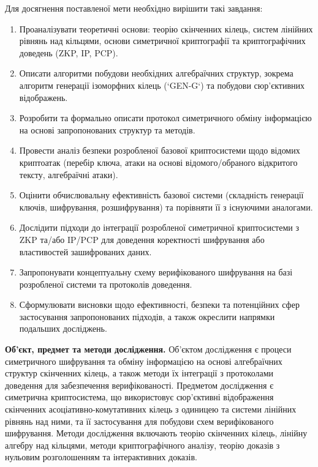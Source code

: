 \documentclass[a4paper,12pt]{article}
\begin{document}
    Для досягнення поставленої мети необхідно вирішити такі завдання:
    \begin{enumerate}
        \item Проаналізувати теоретичні основи: теорію скінченних кілець, систем лінійних рівнянь над кільцями, основи симетричної криптографії та криптографічних доведень (ZKP, IP, PCP).
        \item Описати алгоритми побудови необхідних алгебраїчних структур, зокрема алгоритм генерації ізоморфних кілець (`GEN-G`) та побудови сюр'єктивних відображень.
        \item Розробити та формально описати протокол симетричного обміну інформацією на основі запропонованих структур та методів.
        \item Провести аналіз безпеки розробленої базової криптосистеми щодо відомих криптоатак (перебір ключа, атаки на основі відомого/обраного відкритого тексту, алгебраїчні атаки).
        \item Оцінити обчислювальну ефективність базової системи (складність генерації ключів, шифрування, розшифрування) та порівняти її з існуючими аналогами.
        \item Дослідити підходи до інтеграції розробленої симетричної криптосистеми з ZKP та/або IP/PCP для доведення коректності шифрування або властивостей зашифрованих даних.
        \item Запропонувати концептуальну схему верифікованого шифрування на базі розробленої системи та протоколів доведення.
        \item Сформулювати висновки щодо ефективності, безпеки та потенційних сфер застосування запропонованих підходів, а також окреслити напрямки подальших досліджень.
    \end{enumerate}

    \textbf{Об'єкт, предмет та методи дослідження.} Об'єктом дослідження є процеси симетричного шифрування та обміну інформацією на основі алгебраїчних структур скінченних кілець, а також методи їх інтеграції з протоколами доведення для забезпечення верифікованості. Предметом дослідження є симетрична криптосистема, що використовує сюр'єктивні відображення скінченних асоціативно-комутативних кілець з одиницею та системи лінійних рівнянь над ними, та її застосування для побудови схем верифікованого шифрування. Методи дослідження включають теорію скінченних кілець, лінійну алгебру над кільцями, методи криптографічного аналізу, теорію доказів з нульовим розголошенням та інтерактивних доказів.
\end{document}
